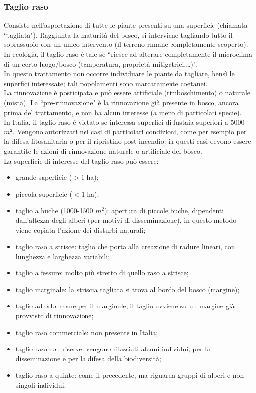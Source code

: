 \documentclass{article}
\begin{document}
\subsubsection{Taglio raso}
Consiste nell'asportazione di tutte le piante presenti su una superficie (chiamata ``tagliata"). Raggiunta la maturità del bosco, si interviene tagliando tutto il soprassuolo con un unico intervento (il terreno rimane completamente scoperto).\\
In ecologia, il taglio raso è tale se ``riesce ad alterare completamente il microclima di un certo luogo/bosco (temperatura, proprietà mitigatrici,\dots)".\\
In questo trattamento non occorre individuare le piante da tagliare, bensì le superfici interessate; tali popolamenti sono marcatamente coetanei. \\
La rinnovazione è posticipata e può essere artificiale (rimboschimento) o naturale (mista). La ``pre-rinnovazione" è la rinnovazione già presente in bosco, ancora prima del trattamento, e non ha alcun interesse (a meno di particolari specie).\\
In Italia, il taglio raso è vietato se interessa superfici di fustaia superiori a 5000 $m^2$. Vengono autorizzati nei casi di particolari condizioni, come per esempio per la difesa fitosanitaria o per il ripristino post-incendio: in questi casi devono essere garantite le azioni di rinnovazione naturale o artificiale del bosco.\\
La superficie di interesse del taglio raso può essere:
\begin{itemize}
    \item grande superficie ($>1$ ha);
    \item piccola superficie ($<1$ ha);
    \item taglio a buche (1000-1500 $m^2$): apertura di piccole buche, dipendenti dall'altezza degli alberi (per motivi di disseminazione), in questo metodo viene copiata l'azione dei disturbi naturali;
    \item taglio raso a strisce: taglio che porta alla creazione di radure lineari, con lunghezza e larghezza variabili;
    \item taglio a fessure: molto più stretto di quello raso a strisce;
    \item taglio marginale: la striscia tagliata si trova al bordo del bosco (margine);
    \item taglio ad orlo: come per il marginale, il taglio avviene su un margine già provvisto di rinnovazione;
    \item taglio raso commerciale: non presente in Italia;
    \item taglio raso con riserve: vengono rilasciati alcuni individui, per la disseminazione e per la difesa della biodiversità;
    \item taglio raso a quinte: come il precedente, ma riguarda gruppi di alberi e non singoli individui.
\end{itemize}
\end{document}
